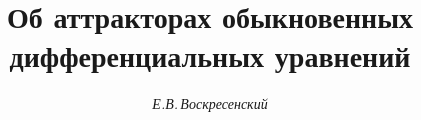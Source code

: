 




%





\renewcommand{\phi}{\varphi}


\newcommand{\R}{{\Bbb R}}


\newcommand{\rar}{\rightarrow}


\newcommand{\lb}{\lambda}


\renewcommand{\baselinestretch}{1.01}


\newcommand{\tts}[1]{}







\setcounter{page}{17}















\author{\it Е.В.\,Воскресенский}




\title{Об аттракторах обыкновенных дифференциальных уравнений}





\date{}




\pagestyle{plain} %







\maketitle


